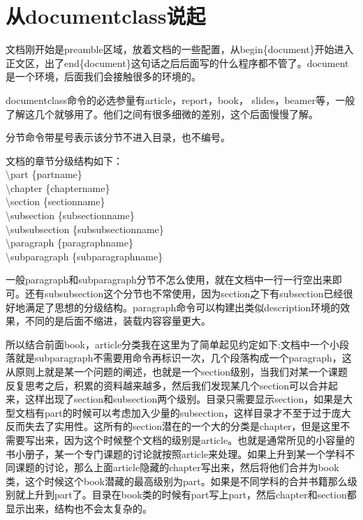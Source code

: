 \documentclass[11pt,oneside]{book}
\begin{document}
  \section{从documentclass说起}
  \label{sec:documentclass}
  文档刚开始是preamble区域，放着文档的一些配置，从begin\{document\}开始进入正文区，出了end\{document\}这句话之后后面写的什么程序都不管了。document是一个环境，后面我们会接触很多的环境的。

  documentclass命令的必选参量有article，report，book， slides，beamer等，一般了解这几个就够用了。他们之间有很多细微的差别，这个后面慢慢了解。

  分节命令带星号表示该分节不进入目录，也不编号。

  文档的章节分级结构如下：\\
  \textbackslash part \{partname\}\\
  \textbackslash chapter \{chaptername\}\\
  \textbackslash section \{sectionname\}\\
  \textbackslash subsection \{subsectionname\}\\
  \textbackslash subsubsection \{subsubsectionname\}\\
  \textbackslash paragraph \{paragraphname\}\\
  \textbackslash subparagraph \{subparagraphname\}

  一般paragraph和subparagraph分节不怎么使用，就在文档中一行一行空出来即可。还有subsubsection这个分节也不常使用，因为section之下有subsection已经很好地满足了思想的分级结构。paragraph命令可以构建出类似description环境的效果，不同的是后面不缩进，装载内容容量更大。

  所以结合前面book，article分类我在这里为了简单起见约定如下:文档中一个小段落就是subparagraph不需要用命令再标识一次，几个段落构成一个paragraph，这从原则上就是某一个问题的阐述，也就是一个section级别，当我们对某一个课题反复思考之后，积累的资料越来越多，然后我们发现某几个section可以合并起来，这样出现了section和subsection两个级别。目录只需要显示section，如果是大型文档有part的时候可以考虑加入少量的subsection，这样目录才不至于过于庞大反而失去了实用性。这所有的section潜在的一个大的分类是chapter，但是这里不需要写出来，因为这个时候整个文档的级别是article。也就是通常所见的小容量的书小册子，某一个专门课题的讨论就按照article来处理。如果上升到某一个学科不同课题的讨论，那么上面article隐藏的chapter写出来，然后将他们合并为book类，这个时候这个book潜藏的最高级别为part。如果是不同学科的合并书籍那么级别就上升到part了。目录在book类的时候有part写上part，然后chapter和section都显示出来，结构也不会太复杂的。
\end{document}
